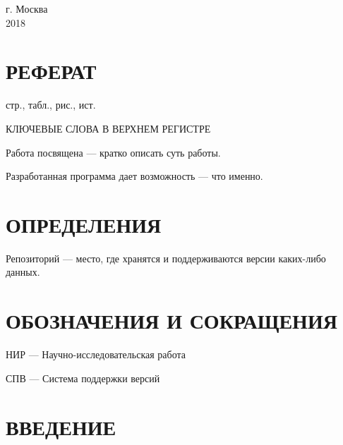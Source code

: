 \documentclass[a4paper,12pt]{article}
\newcounter{mycitecount}                                %
\begin{document}
\renewcommand{\arraystretch}{1}

\vfill

\begin{center}
г. Москва\\
2018
\end{center}

\pagebreak

\restoregeometry

\onehalfspacing


\thispagestyle{empty}

\section*{\centering РЕФЕРАТ}

 стр.,  табл.,  рис., \totalmycitecounts ист. 

КЛЮЧЕВЫЕ СЛОВА В ВЕРХНЕМ РЕГИСТРЕ

Работа посвящена --- кратко описать суть работы.

Разработанная программа дает возможность --- что именно.

\pagebreak
\thispagestyle{empty}

\section*{\centering ОПРЕДЕЛЕНИЯ}

Репозиторий --- место, где хранятся и поддерживаются версии каких-либо данных. 

\pagebreak

\section*{\centering ОБОЗНАЧЕНИЯ И СОКРАЩЕНИЯ}


НИР --- Научно-исследовательская работа

СПВ --- Система поддержки версий



\pagebreak



\tableofcontents

\pagebreak

\section*{\centering ВВЕДЕНИЕ}
\end{document}
